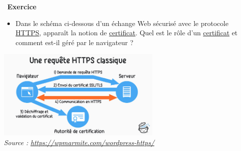 \documentclass[
  11pt,
]{article}
\providecommand{\tightlist}{%
  \setlength{\itemsep}{0pt}\setlength{\parskip}{0pt}}
\newcounter{exo}
\newenvironment{exercice}[1]
{\par \medskip   \addtocounter{exo}{1} \noindent  
\begin{bclogo}[arrondi =0.1,   noborder = true, logo=\bccrayon, marge=4]{~\textbf{Exercice} \textbf{\theexo} {\itshape #1} }  \par}
{
\end{bclogo}
 \par \bigskip }
\begin{document}
\begin{exercice}{}
\begin{enumerate}
  \begin{itemize}
  \tightlist
  \item
    Dans le schéma ci-dessous d'un échange Web sécurisé avec le
    protocole
    \href{https://developer.mozilla.org/fr/docs/Glossaire/https}{HTTPS},
    apparaît la notion de
    \href{https://developer.mozilla.org/fr/docs/Glossaire/Certificat_num\%C3\%A9rique}{certificat}.
    Quel est le rôle d'un
    \href{https://developer.mozilla.org/fr/docs/Glossaire/Certificat_num\%C3\%A9rique}{certificat}
    et comment est-il géré par le navigateur ?
  \end{itemize}

  \includegraphics[width=0.6\textwidth,height=\textheight]{images/schema-requete-https.jpg}\\

  \emph{Source : \url{https://wpmarmite.com/wordpress-https/}}
\end{enumerate}

\end{exercice}
\end{document}
